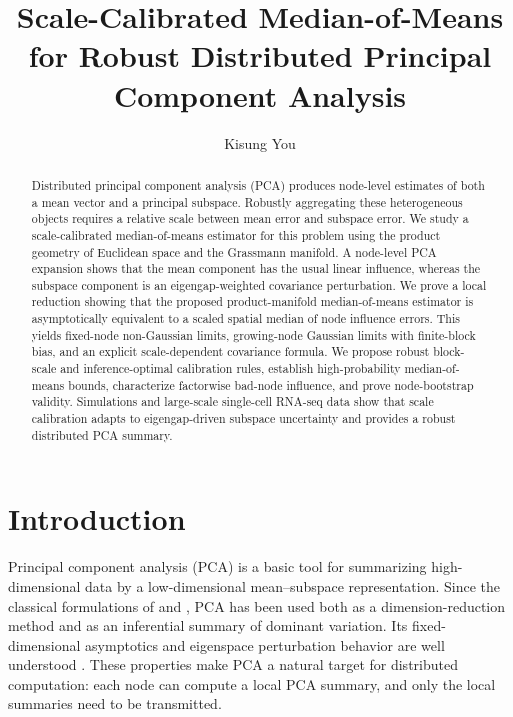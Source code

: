 \documentclass[11pt]{article}
\begin{document}
	
\title{Scale-Calibrated Median-of-Means for Robust Distributed Principal Component Analysis}
\author[1,2]{Kisung You}
\date{}

\maketitle
\begin{abstract}
Distributed principal component analysis (PCA) produces node-level estimates of both
a mean vector and a principal subspace.  Robustly aggregating these heterogeneous
objects requires a relative scale between mean error and subspace error.  We
study a scale-calibrated median-of-means estimator for this problem using the
product geometry of Euclidean space and the Grassmann manifold.  A node-level
PCA expansion shows that the mean component has the usual linear influence,
whereas the subspace component is an eigengap-weighted covariance perturbation.
We prove a local reduction showing that the proposed product-manifold
median-of-means estimator is asymptotically equivalent to a scaled spatial
median of node influence errors.  This yields fixed-node non-Gaussian limits,
growing-node Gaussian limits with finite-block bias, and an explicit
scale-dependent covariance formula.  We propose robust block-scale and
inference-optimal calibration rules, establish high-probability
median-of-means bounds, characterize factorwise bad-node influence, and prove
node-bootstrap validity.  Simulations and large-scale single-cell RNA-seq data
show that scale calibration adapts to eigengap-driven subspace uncertainty and
provides a robust distributed PCA summary.
\end{abstract}




\section{Introduction}\label{sec:introduction}


Principal component analysis (PCA) is a basic tool for summarizing
high-dimensional data by a low-dimensional mean--subspace representation.  Since
the classical formulations of \citet{pearson_1901_LIIILinesPlanes} and
\citet{hotelling_1933_AnalysisComplexStatistical}, PCA has been used both as a
dimension-reduction method and as an inferential summary of dominant variation.
Its fixed-dimensional asymptotics and eigenspace perturbation behavior are well
understood
\citep{anderson_1963_AsymptoticTheoryPrincipal,
davis_1970_RotationEigenvectorsPerturbation,
stewart_1990_MatrixPerturbationTheory,
kato_1995_PerturbationTheoryLinear}.  These properties make PCA a natural
target for distributed computation: each node can compute a local PCA summary,
and only the local summaries need to be transmitted.
\end{document}
